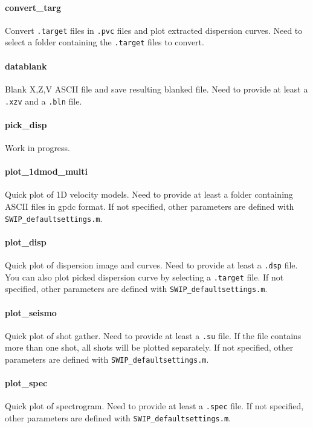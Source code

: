 \documentclass[twoside,a4paper]{article}
\begin{document}
\paragraph{convert\_targ}
Convert \verb|.target| files in \verb|.pvc| files and plot extracted dispersion curves. Need to select a folder containing the \verb|.target| files to convert.

\paragraph{datablank}
Blank X,Z,V ASCII file and save resulting blanked file. Need to provide at least a \verb|.xzv| and a \verb|.bln| file.

\paragraph{pick\_disp}
Work in progress.

\paragraph{plot\_1dmod\_multi}
Quick plot of 1D velocity models. Need to provide at least a folder containing ASCII files in gpdc format. If not specified, other parameters are defined with \verb|SWIP_defaultsettings.m|.

\paragraph{plot\_disp}
Quick plot of dispersion image and curves. Need to provide at least a \verb|.dsp| file. You can also plot picked dispersion curve by selecting a \verb|.target| file. If not specified, other parameters are defined with \verb|SWIP_defaultsettings.m|.

\paragraph{plot\_seismo}
Quick plot of shot gather. Need to provide at least a \verb|.su| file. If the file contains more than one shot, all shots will be plotted separately. If not specified, other parameters are defined with \verb|SWIP_defaultsettings.m|.

\paragraph{plot\_spec}
Quick plot of spectrogram. Need to provide at least a \verb|.spec| file. If not specified, other parameters are defined with \verb|SWIP_defaultsettings.m|.
\end{document}
